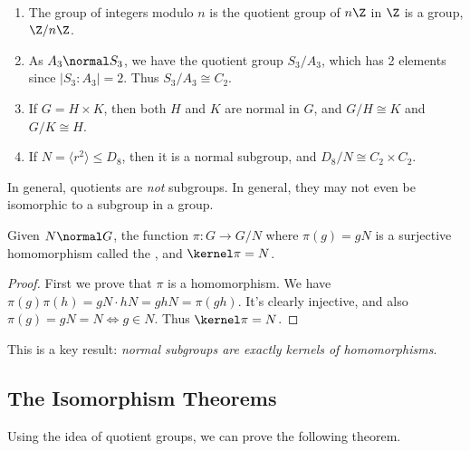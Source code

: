 \documentclass[a4paper]{scrartcl}
\newcommand{\newsection}{\subsection}
\begin{document}
\begin{example}~
	    \vspace*{-1.5\baselineskip}
	\begin{enumerate}[label=(\roman*)]
		\item The group of integers modulo $n$ is the quotient group of $n\Z$ in $\Z$ is a group, $\Z/n\Z$.
		\item As $A_3 \normal S_3$, we have the quotient group $S_3/A_3$, which has 2 elements since $|S_3 : A_3| = 2$. Thus $S_3 / A_3 \cong C_2$.
		\item If $G = H \times K$, then both $H$ and $K$ are normal in $G$, and $G/H \cong K$ and $G/K \cong H$.
		\item If $N = \langle r^2 \rangle \leq D_8$, then it is a normal subgroup, and $D_8/N \cong C_2 \times C_2$. 
	\end{enumerate}
\end{example}

\begin{remark}
	In general, quotients are \emph{not} subgroups. In general, they may not even be isomorphic to a subgroup in a group.
\end{remark}

\begin{theorem}
	Given $N \normal G$, the function $\pi : G \rightarrow G/N$ where $\pi(g) = gN$ is a surjective homomorphism called the , and $\kernel \pi = N$.
\end{theorem}
\begin{proof}
	First we prove that $\pi$ is a homomorphism. We have $\pi(g)\pi(h) = gN \cdot hN = gh N = \pi(gh)$. It's clearly injective, and also $\pi(g)= gN = N \iff g \in N$. Thus $\kernel \pi = N$.
\end{proof}

This is a key result: \emph{normal subgroups are exactly kernels of homomorphisms}.

\newsection{The Isomorphism Theorems}

Using the idea of quotient groups, we can prove the following theorem.
\end{document}
